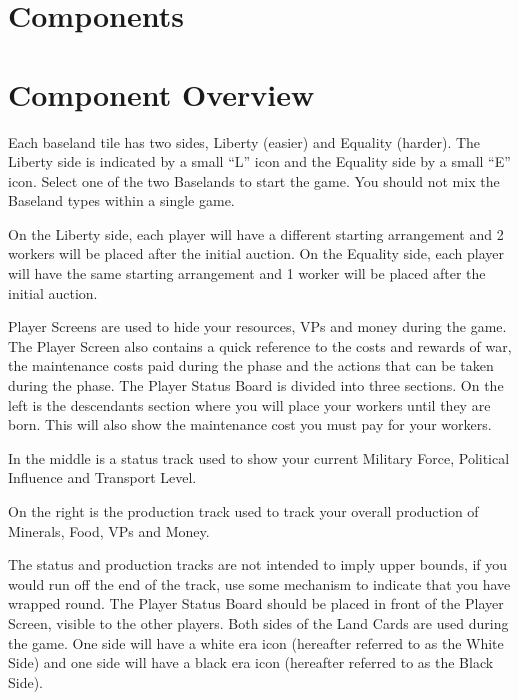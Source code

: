 \documentclass[10pt,twocolumn]{article}
\begin{document}
\section{Components}
\section{Component Overview}
Each baseland tile has two sides, Liberty (easier) and Equality (harder). The Liberty side is indicated by a small ``L'' icon and the Equality side by a small ``E'' icon. Select one of the two Baselands to start the game. You should not mix the Baseland types within a single game.

On the Liberty side, each player will have a different starting arrangement and 2 workers will be placed after the initial auction. On the Equality side, each player will have the same starting arrangement and 1 worker will be placed after the initial auction.

Player Screens are used to hide your resources, VPs and money during the game. The Player Screen also contains a quick reference to the costs and rewards of war, the maintenance costs paid during the  phase and the actions that can be taken during the  phase.
The Player Status Board is divided into three sections. On the left is the descendants section where you will place your workers until they are born. This will also show the maintenance cost you must pay for your workers.

In the middle is a status track used to show your current Military Force, Political Influence and Transport Level.

On the right is the production track used to track your overall production of Minerals, Food, VPs and Money.

The status and production tracks are not intended to imply upper bounds, if you would run off the end of the track, use some mechanism to indicate that you have wrapped round. The Player Status Board should be placed in front of the Player Screen, visible to the other players.
Both sides of the Land Cards are used during the game. One side will have a white era icon (hereafter referred to as the White Side) and one side will have a black era icon (hereafter referred to as the Black Side).
\end{document}
